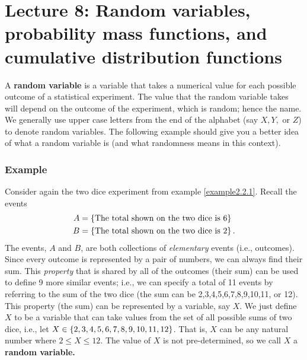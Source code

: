 \chapter{Lecture 8: Random variables, probability mass functions, and cumulative distribution functions} \label{lec8}
A \textbf{random variable} is a variable that takes a numerical value for each possible outcome of a statistical experiment. The value that the random variable takes will depend on the outcome of the experiment, which is random; hence the name. We generally use upper case letters from the end of the alphabet (say $X, Y,$ or $Z$) to denote random variables. The following example should give you a better idea of what a random variable is (and what randomness means in this context).

\subsection{Example} \label{example8.1}
Consider again the two dice experiment from example \ref{example2.2.1}. Recall the events
\begin{align*}
A & = \left\{\text{The total shown on the two dice is 6}\right\} \\
B & = \left\{\text{The total shown on the two dice is 2}\right\}.
\end{align*}
The events, $A$ and $B$, are both collections of \textit{elementary} events (i.e., outcomes). Since every outcome is represented by a pair of numbers, we can always find their sum. This \textit{property} that is shared by all of the outcomes (their sum) can be used to define 9 more similar events; i.e., we can specify a total of 11 events by referring to the sum of the two dice (the sum can be 2,3,4,5,6,7,8,9,10,11, or 12). \\

\noindent This property (the sum) can be represented by a variable, say $X$. We just define $X$ to be a variable that can take values from the set of all possible sums of two dice, i.e., let $X \in \left\{2,3,4,5,6,7,8,9,10,11,12\right\}$. That is, $X$ can be any natural number where $2 \leq X \leq 12.$ The value of $X$ is not pre-determined, so we call $X$ a \textbf{random variable.} \label{random variable} \\

